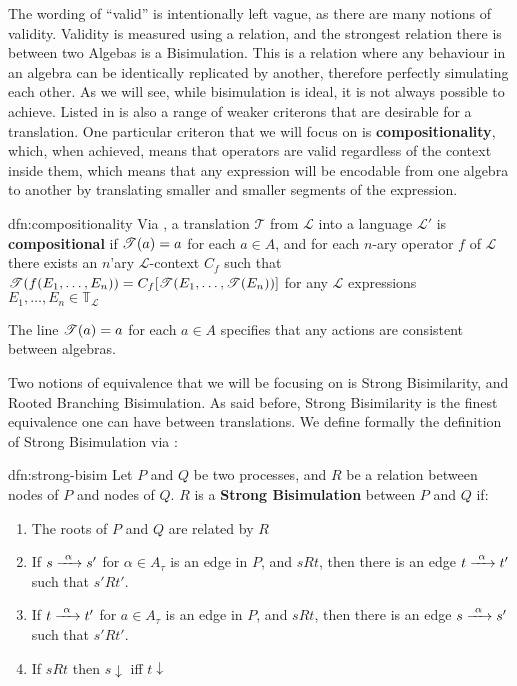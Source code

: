 \documentclass[../hons_project.tex]{subfiles}
\begin{document}
The wording of ``valid'' is intentionally left vague, as there are many notions of validity. Validity is measured using a relation, and the strongest relation there is between two Algebas is a Bisimulation. This is a relation where any behaviour in an algebra can be identically replicated by another, therefore perfectly simulating each other. As we will see, while bisimulation is ideal, it is not always possible to achieve. Listed in \cite{parrowExpressivenessProcessAlgebras2008} is also a range of weaker criterons that are desirable for a translation. One particular criteron that we will focus on is \textbf{compositionality}, which, when achieved, means that operators are valid regardless of the context inside them, which means that any expression will be encodable from one algebra to another by translating smaller and smaller segments of the expression.

\begin{dfn}[Compositionality]{dfn:compositionality}{}
   Via \cite{DBLP:conf/fossacs/Glabbeek18}, a translation $\mathscr{T}$ from $\mathscr{L}$ into a language $\mathscr{L}'$ is \textbf{compositional} if $\mathscr{T}(a) = a$ for each $a\in A$, and for each $n$-ary operator $f$ of $\mathscr{L}$ there exists an $n$'ary $\mathscr{L}$-context $C_{f}$ such that $\mathscr{T}(f(E_{1},\dots,E_{n})) = C_{f}[\mathscr{T}(E_{1},\dots,\mathscr{T}(E_{n}))]$ for any $\mathscr{L}$ expressions $E_{1},\dots,E_{n}\in \mathbb{T}_{\mathscr{L}}$
\end{dfn}

The line $\mathscr{T}(a) = a$ for each $a\in A$ specifies that any actions are consistent between algebras.

Two notions of equivalence that we will be focusing on is Strong Bisimilarity, and Rooted Branching Bisimulation. As said before, Strong Bisimilarity is the finest equivalence one can have between translations. We define formally the definition of Strong Bisimulation via \cite{baetenProcessAlgebra1990}:

\begin{dfn}{dfn:strong-bisim}{}
   Let $P$ and $Q$ be two processes, and $R$ be a relation between nodes of $P$ and nodes of $Q$. $R$ is a \textbf{Strong Bisimulation} between $P$ and $Q$ if:
   \begin{enumerate}
      \item The roots of $P$ and $Q$ are related by $R$
      \item If $s \prightarrow{\alpha} s'$ for $\alpha\in A_{\tau}$ is an edge in $P$, and $s R t$, then there is an edge $t \prightarrow{\alpha} t'$ such that $s' R t'$.
      \item If $t \prightarrow{\alpha} t'$ for $a\in A_{\tau}$ is an edge in $P$, and $s R t$, then there is an edge $s \prightarrow{\alpha} s'$ such that $s' R t'$.
      \item If $s R t$ then $s\downarrow$ iff $t \downarrow$
   \end{enumerate}
\end{dfn}
\end{document}
